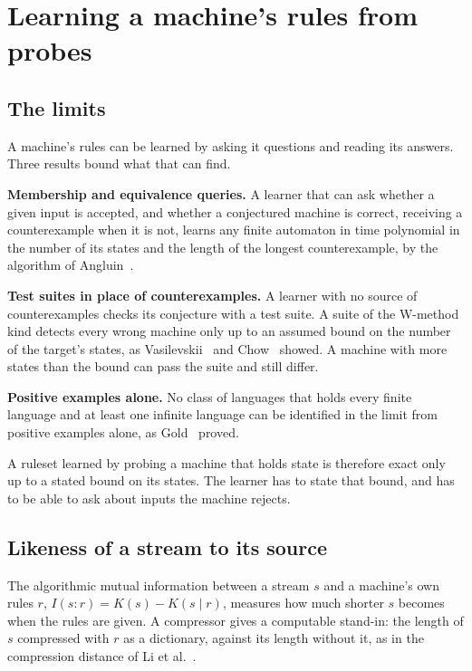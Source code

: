 \chapter{\texorpdfstring{Learning a machine's rules from probes}{Learning a machine's rules from probes}}
\label{chap:learning-a-ruleset}

\section{\texorpdfstring{The limits}{The limits}}

A machine's rules can be learned by asking it questions and reading its answers. Three results bound what that can find.

\textbf{Membership and equivalence queries.} A learner that can ask whether a given input is accepted, and whether a conjectured machine is correct, receiving a counterexample when it is not, learns any finite automaton in time polynomial in the number of its states and the length of the longest counterexample, by the algorithm of Angluin~\cite{src:Angluin-1987}.

\textbf{Test suites in place of counterexamples.} A learner with no source of counterexamples checks its conjecture with a test suite. A suite of the W-method kind detects every wrong machine only up to an assumed bound on the number of the target's states, as Vasilevskii~\cite{src:Vasilevskii-1973} and Chow~\cite{src:Chow-1978} showed. A machine with more states than the bound can pass the suite and still differ.

\textbf{Positive examples alone.} No class of languages that holds every finite language and at least one infinite language can be identified in the limit from positive examples alone, as Gold~\cite{src:Gold-1967} proved.

A ruleset learned by probing a machine that holds state is therefore exact only up to a stated bound on its states. The learner has to state that bound, and has to be able to ask about inputs the machine rejects.

\section{\texorpdfstring{Likeness of a stream to its source}{Likeness of a stream to its source}}

The algorithmic mutual information between a stream \(s\) and a machine's own rules \(r\), \(I(s : r) = K(s) - K(s \mid r)\), measures how much shorter \(s\) becomes when the rules are given. A compressor gives a computable stand-in: the length of \(s\) compressed with \(r\) as a dictionary, against its length without it, as in the compression distance of Li et al.~\cite{src:Li-2004}.

